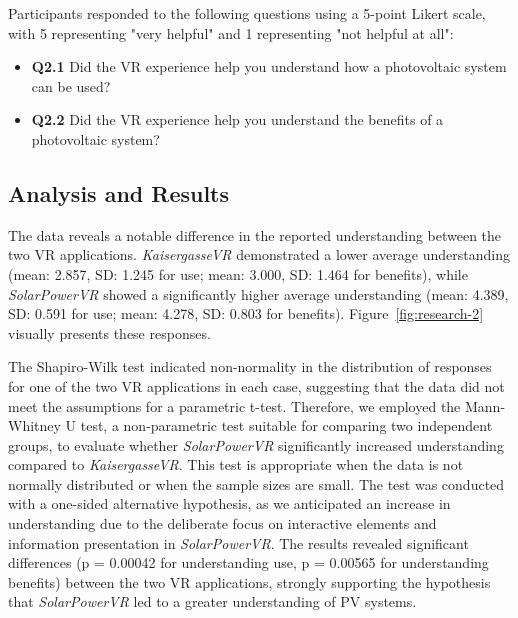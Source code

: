 \documentclass[draft, final]{vutinfth} %
\begin{document}
Participants responded to the following questions using a 5-point Likert scale, with 5 representing "very helpful" and 1 representing "not helpful at all":

\begin{itemize}
    \item \textbf{Q2.1} Did the VR experience help you understand how a photovoltaic system can be used?
    \item \textbf{Q2.2} Did the VR experience help you understand the benefits of a photovoltaic system?
\end{itemize}

\subsection{Analysis and Results}

The data reveals a notable difference in the reported understanding between the two VR applications. \textit{KaisergasseVR} demonstrated a lower average understanding (mean: 2.857, SD: 1.245 for use; mean: 3.000, SD: 1.464 for benefits), while \textit{SolarPowerVR} showed a significantly higher average understanding (mean: 4.389, SD: 0.591 for use; mean: 4.278, SD: 0.803 for benefits). Figure~\ref{fig:research-2} visually presents these responses.

The Shapiro-Wilk test indicated non-normality in the distribution of responses for one of the two VR applications in each case, suggesting that the data did not meet the assumptions for a parametric t-test. Therefore, we employed the Mann-Whitney U test, a non-parametric test suitable for comparing two independent groups, to evaluate whether \textit{SolarPowerVR} significantly increased understanding compared to \textit{KaisergasseVR}. This test is appropriate when the data is not normally distributed or when the sample sizes are small. The test was conducted with a one-sided alternative hypothesis, as we anticipated an increase in understanding due to the deliberate focus on interactive elements and information presentation in \textit{SolarPowerVR}. The results revealed significant differences (p = 0.00042 for understanding use, p = 0.00565 for understanding benefits) between the two VR applications, strongly supporting the hypothesis that \textit{SolarPowerVR} led to a greater understanding of PV systems.
\end{document}
